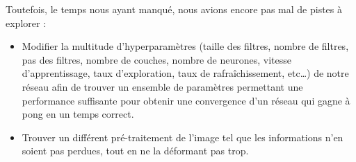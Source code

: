 \documentclass[
    10pt,
    a4paper,
    oneside,
    headinclude,footinclude,
    BCOR=5mm,
    captions=tableabove
]{scrartcl}
\begin{document}
Toutefois, le temps nous ayant manqué, nous avions encore pas mal de pistes à explorer :

\begin{itemize}
\item Modifier la multitude d’hyperparamètres (taille des filtres, nombre de filtres, pas des filtres, nombre de couches, nombre de neurones, vitesse d’apprentissage, taux d’exploration, taux de rafraîchissement, etc…) de notre réseau afin de trouver un ensemble de paramètres permettant une performance suffisante pour obtenir une convergence d’un réseau qui gagne à pong en un temps correct.
\item Trouver un différent pré-traitement de l’image tel que les informations n’en soient pas perdues, tout en ne la déformant pas trop.
\end{itemize}

\renewcommand{\refname}{\spacedlowsmallcaps{References}} %
\nocite{*}


\end{document}

